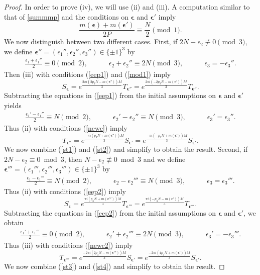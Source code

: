 \documentclass[11pt,reqno]{amsart}
\theoremstyle{definition}
\numberwithin{equation}{section}
\newcommand{\bea}{\begin{equation}\begin{aligned}}
\newcommand{\eea}{\end{aligned}\end{equation}}
\renewcommand{\=}{\;=\;}
\def\qqquad{\qquad\quad}
\begin{document}
\begin{proof}
In order to prove (iv), we will use (ii) and (iii). A computation similar to that of \eqref{summmp} and the conditions on $\bm \epsilon$ and $\bm \epsilon'$ imply
\begin{equation} \label{mod1}
\frac{m(\bm \epsilon)+m(\bm \epsilon')}{2P} \equiv \frac N 2 \pmod 1.
\end{equation}
We now distinguish between two different cases. First, if $2N-\epsilon_2 \not \equiv  0 \pmod 3$, we define $\bm \epsilon'' =(\epsilon_1'', \epsilon_2'', \epsilon_3'') \in\{\pm 1\}^3$ by
 \bea\label{eep1}
 \frac{\epsilon_1 + \epsilon_1''}{2} \equiv 0 \pmod 2,\qqquad
 \epsilon_2+\epsilon_2'' \equiv 2N \pmod 3,\qqquad
 \epsilon_3=-\epsilon_3''.
 \eea
Then (iii) with conditions (\ref{eep1}) and (\ref{mod1}) imply
\begin{equation} \label{st1}
S_{\bm \epsilon} = e^{\frac{2 \pi i \left (2p_3 N - m(\bm \epsilon'')\right)M}{3}} T_{\bm \epsilon''}
 = e^{\frac{2 \pi i \left (-2p_3 N - m(\bm \epsilon') \right)M}{3}} T_{\bm \epsilon''}.
 \end{equation}
Subtracting the equations in (\ref{eep1}) from the initial assumptions on $\bm \epsilon$ and $\bm \epsilon'$ yields
 \bea \label{newc}
 \frac{\epsilon_1'-\epsilon_1''}{2} \equiv N \pmod 2,\qqquad
 \epsilon_2'-\epsilon_2'' \equiv N \pmod 3,\qqquad
 \epsilon_3'=\epsilon_3''.
 \eea
Thus (ii) with conditions (\ref{newc}) imply
\begin{equation} \label{st2}
T_{\bm \epsilon''} = e^{\frac{-\pi i \left ( p_3 N + m(\bm \epsilon'') \right) M}{3}} S_{\bm \epsilon'} = e^{\frac{-\pi i \left ( -p_3 N + m(\bm \epsilon') \right) M}{3}} S_{\bm \epsilon'}.
\end{equation} 
We now combine (\ref{st1}) and (\ref{st2}) and simplify to obtain the result. Second, if $2N-\epsilon_2 \equiv  0 \bmod 3$, then $N-\epsilon_2 \not\equiv 0 \bmod 3$ and we define 
$\bm \epsilon''' = (\epsilon_1''', \epsilon_2''', \epsilon_3''') \in\{\pm 1\}^3$ by
 \bea \label{eep2}
 \frac{\epsilon_1-\epsilon_1'''}{2} \equiv N \pmod 2,\qqquad
 \epsilon_2-\epsilon_2''' \equiv N \pmod 3,\qqquad
 \epsilon_3=\epsilon_3'''.
 \eea
Thus (ii) with conditions (\ref{eep2}) imply 
\begin{equation} \label{st3}
S_{\bm \epsilon} = e^{\frac{\pi i \left( p_3 N + m(\bm \epsilon''') \right) M}{3}} T_{\bm \epsilon'''} = e^{\frac{\pi i \left( -p_3 N - m(\bm \epsilon') \right) M}{3}} T_{\bm \epsilon'''}. 
\end{equation}
Subtracting the equations in (\ref{eep2}) from the initial assumptions on $\bm \epsilon$ and $\bm \epsilon'$, we obtain
 \bea \label{newc2}
 \frac{\epsilon_1'+\epsilon_1'''}{2} \equiv 0 \pmod 2,\qqquad
 \epsilon_2'+\epsilon_2''' \equiv 2N \pmod 3,\qqquad
 \epsilon_3'=-\epsilon_3'''.
 \eea
 Thus (iii) with conditions (\ref{newc2}) imply
 \begin{equation} \label{st4}
 T_{\bm \epsilon'''} = e^{\frac{-2\pi i \left( 2p_3 N - m(\bm \epsilon''') \right) M}{3}} S_{\bm \epsilon'} = e^{\frac{-2\pi i \left( 4p_3 N + m(\bm \epsilon') \right) M}{3}} S_{\bm \epsilon'}.
 \end{equation}
 We now combine (\ref{st3}) and (\ref{st4}) and simplify to obtain the result.
 \end{proof}
\end{document}
